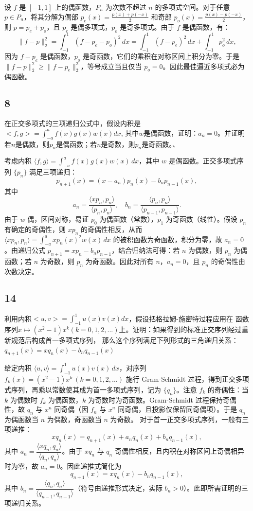 \documentclass{article}
\begin{document}
设 \(f\) 是 \([-1,1]\) 上的偶函数，\(P_n\) 为次数不超过 \(n\) 的多项式空间。对于任意 \(p \in P_n\)，将其分解为偶部 \(p_e(x) = \frac{p(x)+p(-x)}{2}\) 和奇部 \(p_o(x) = \frac{p(x)-p(-x)}{2}\)，则 \(p = p_e + p_o\)，且 \(p_e\) 是偶多项式，\(p_o\) 是奇多项式。由于 \(f\) 是偶函数，有：
\[
\|f - p\|_2^2 = \int_{-1}^1 (f - p_e - p_o)^2 \, dx = \int_{-1}^1 (f - p_e)^2 \, dx + \int_{-1}^1 p_o^2 \, dx,
\]
因为 \(f - p_e\) 是偶函数，\(p_o\) 是奇函数，它们的乘积在对称区间上积分为零。于是 \(\|f - p\|_2^2 \ge \|f - p_e\|_2^2\)，等号成立当且仅当 \(p_o = 0\)。因此最佳逼近多项式必为偶函数。

\subsection*{8}
在正交多项式的三项递归公式中，假设内积是$<f,g>=\int_{-a}^{a} f(x)g(x)w(x)dx$,
其中$w$是偶函数，证明：$a_n=0$。并证明若$n$是偶数，则$p_n$是偶函数；若$n$是奇数，则$p_n$是奇函数。、


考虑内积 \(\langle f, g \rangle = \int_{-a}^a f(x)g(x)w(x) \, dx\)，其中 \(w\) 是偶函数。正交多项式序列 \(\{p_n\}\) 满足三项递归：
\[
p_{n+1}(x) = (x - a_n)p_n(x) - b_n p_{n-1}(x),
\]
其中
\[
a_n = \frac{\langle x p_n, p_n \rangle}{\langle p_n, p_n \rangle}, \quad b_n = \frac{\langle p_n, p_n \rangle}{\langle p_{n-1}, p_{n-1} \rangle}.
\]
由于 \(w\) 偶，区间对称，易证 \(p_0\) 为偶函数（常数），\(p_1\) 为奇函数（线性）。假设 \(p_n\) 有确定的奇偶性，则 \(x p_n\) 的奇偶性相反，从而 \(\langle x p_n, p_n \rangle = \int_{-a}^a x p_n(x)^2 w(x) \, dx\) 的被积函数为奇函数，积分为零，故 \(a_n = 0\)。由递归公式 \(p_{n+1} = x p_n - b_n p_{n-1}\)，结合归纳法可得：若 \(n\) 为偶数，则 \(p_n\) 为偶函数；若 \(n\) 为奇数，则 \(p_n\) 为奇函数。因此对所有 \(n\)，\(a_n = 0\)，且 \(p_n\) 的奇偶性由次数决定。


\subsection*{14}
利用内积$<u,v>=\int_{-1}^{1}u(x)v(x)dx$，假设把格拉姆-施密特过程应用在
函数序列$x\mapsto (x^2-1)x^k(k=0,1,2,...)$上。证明：如果得到的标准正交序列经过重新规范后构成首一多项式序列，
那么这个序列满足下列形式的三角递归关系：$q_{n+1}(x)=xq_{n}(x)-b_nq_{n-1}(x)$

给定内积 \(\langle u,v\rangle = \int_{-1}^{1} u(x)v(x)\,dx\)，对序列 \(f_k(x) = (x^2-1)x^k\ (k=0,1,2,\dots)\) 施行 Gram-Schmidt 过程，得到正交多项式序列，再乘以常数使其成为首一多项式序列，记为 \(\{q_n\}\)。注意 \(f_k\) 的奇偶性：当 \(k\) 为偶数时 \(f_k\) 为偶函数，\(k\) 为奇数时为奇函数。Gram-Schmidt 过程保持奇偶性，故 \(q_n\) 与 \(x^n\) 同奇偶（因 \(f_n\) 与 \(x^n\) 同奇偶，且投影仅保留同奇偶项）。于是 \(q_n\) 为偶函数当 \(n\) 为偶数，奇函数当 \(n\) 为奇数。  
对于首一正交多项式序列，一般有三项递推：
\[
x q_n(x) = q_{n+1}(x) + a_n q_n(x) + b_n q_{n-1}(x),
\]
其中 \(a_n = \dfrac{\langle x q_n, q_n \rangle}{\langle q_n, q_n \rangle}\)。由于 \(x q_n\) 与 \(q_n\) 奇偶性相反，且内积在对称区间上奇偶相异时为零，故 \(a_n = 0\)。因此递推式简化为
\[
q_{n+1}(x) = x q_n(x) - b_n q_{n-1}(x),
\]
其中 \(b_n = \dfrac{\langle q_n, q_n \rangle}{\langle q_{n-1}, q_{n-1} \rangle}\)（符号由递推形式决定，实际 \(b_n > 0\)）。此即所需证明的三项递归关系。
\end{document}
